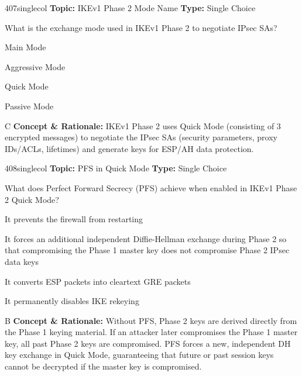 \begin{qcard}{407}{singlecol}
\textcolor{darkslate!75}{\small\textbf{Topic:} IKEv1 Phase 2 Mode Name \hfill \textbf{Type:} Single Choice}\vspace{0.4em}\par
What is the exchange mode used in IKEv1 Phase 2 to negotiate IPsec SAs?
\begin{qoptions}
\item Main Mode
\item Aggressive Mode
\item Quick Mode
\item Passive Mode
\end{qoptions}
\end{qcard}
\nopagebreak
\begin{explainbox}{C}
\textbf{Concept \& Rationale:} IKEv1 Phase 2 uses Quick Mode (consisting of 3 encrypted messages) to negotiate the IPsec SAs (security parameters, proxy IDs/ACLs, lifetimes) and generate keys for ESP/AH data protection.
\end{explainbox}

\begin{qcard}{408}{singlecol}
\textcolor{darkslate!75}{\small\textbf{Topic:} PFS in Quick Mode \hfill \textbf{Type:} Single Choice}\vspace{0.4em}\par
What does Perfect Forward Secrecy (PFS) achieve when enabled in IKEv1 Phase 2 Quick Mode?
\begin{qoptions}
\item It prevents the firewall from restarting
\item It forces an additional independent Diffie-Hellman exchange during Phase 2 so that compromising the Phase 1 master key does not compromise Phase 2 IPsec data keys
\item It converts ESP packets into cleartext GRE packets
\item It permanently disables IKE rekeying
\end{qoptions}
\end{qcard}
\nopagebreak
\begin{explainbox}{B}
\textbf{Concept \& Rationale:} Without PFS, Phase 2 keys are derived directly from the Phase 1 keying material. If an attacker later compromises the Phase 1 master key, all past Phase 2 keys are compromised. PFS forces a new, independent DH key exchange in Quick Mode, guaranteeing that future or past session keys cannot be decrypted if the master key is compromised.
\end{explainbox}

